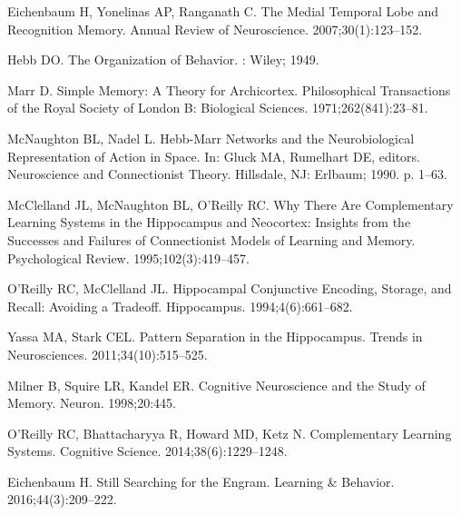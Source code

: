 \documentclass[10pt,letterpaper]{article}
\begin{document}
\begin{thebibliography}{10}

  Eichenbaum H, Yonelinas AP, Ranganath C.
  \newblock The Medial Temporal Lobe and Recognition Memory.
  \newblock Annual Review of Neuroscience. 2007;30(1):123--152.
  
  Hebb DO.
  \newblock The {{Organization}} of {{Behavior}}.
  : {Wiley}; 1949.
  
  Marr D.
  \newblock Simple {{Memory}}: {{A Theory}} for {{Archicortex}}.
  \newblock Philosophical Transactions of the Royal Society of London B:
    Biological Sciences. 1971;262(841):23--81.
  
  McNaughton BL, Nadel L.
  \newblock Hebb-{{Marr Networks}} and the {{Neurobiological Representation}} of
    {{Action}} in {{Space}}.
  \newblock In: Gluck MA, Rumelhart DE, editors. Neuroscience and {{Connectionist
    Theory}}. {Hillsdale, NJ}: {Erlbaum}; 1990. p. 1--63.
  
  McClelland JL, McNaughton BL, O'Reilly RC.
  \newblock Why {{There Are Complementary Learning Systems}} in the
    {{Hippocampus}} and {{Neocortex}}: {{Insights}} from the {{Successes}} and
    {{Failures}} of {{Connectionist Models}} of {{Learning}} and {{Memory}}.
  \newblock Psychological Review. 1995;102(3):419--457.
  
  O'Reilly RC, McClelland JL.
  \newblock Hippocampal {{Conjunctive Encoding}}, {{Storage}}, and {{Recall}}:
    {{Avoiding}} a {{Tradeoff}}.
  \newblock Hippocampus. 1994;4(6):661--682.
  
  Yassa MA, Stark CEL.
  \newblock Pattern Separation in the Hippocampus.
  \newblock Trends in Neurosciences. 2011;34(10):515--525.
  
  Milner B, Squire LR, Kandel ER.
  \newblock Cognitive {{Neuroscience}} and the {{Study}} of {{Memory}}.
  \newblock Neuron. 1998;20:445.
  
  O'Reilly RC, Bhattacharyya R, Howard MD, Ketz N.
  \newblock Complementary {{Learning Systems}}.
  \newblock Cognitive Science. 2014;38(6):1229--1248.
  
  Eichenbaum H.
  \newblock Still Searching for the Engram.
  \newblock Learning \& Behavior. 2016;44(3):209--222.
  

\end{thebibliography}
\end{document}
